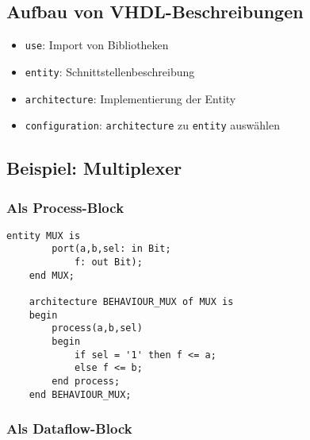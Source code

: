 \subsection{Aufbau von VHDL-Beschreibungen}
\begin{itemize}
    \item \lstinline[style=vhdl]{use}: Import von Bibliotheken
    \item \lstinline[style=vhdl]{entity}: Schnittstellenbeschreibung
    \item \lstinline[style=vhdl]{architecture}: Implementierung der Entity
    \item \lstinline[style=vhdl]{configuration}: \lstinline[style=vhdl]{architecture} zu \lstinline[style=vhdl]{entity} auswählen
\end{itemize}

\subsection{Beispiel: Multiplexer}
\subsubsection{Als Process-Block}
\begin{lstlisting}[style=vhdl]
    entity MUX is
        port(a,b,sel: in Bit;
            f: out Bit);
    end MUX;

    architecture BEHAVIOUR_MUX of MUX is
    begin
        process(a,b,sel)
        begin
            if sel = '1' then f <= a;
            else f <= b;
        end process;
    end BEHAVIOUR_MUX;
\end{lstlisting}

\subsubsection{Als Dataflow-Block}
